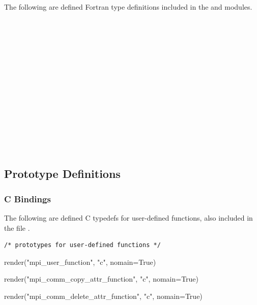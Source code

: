 The following are defined Fortran type definitions included in the  and  modules.
\\[6pt]
 \\
 \\
\code{ } \\
 \\
 \\
 \\
 \\
 \\
 \\
 \\
 \\
 \\
 \\
 \\


\subsection{Prototype Definitions} 
\label{subsec:annexa-prototypes} %

% 
\subsubsection{C Bindings} 
% 

The following are defined C typedefs for user-defined functions, 
also included in the file .

\begin{verbatim}
/* prototypes for user-defined functions */
\end{verbatim}
\begin{mpi-binding}
    render("mpi_user_function", "c", nomain=True)
\end{mpi-binding}

\begin{mpi-binding}
    render("mpi_comm_copy_attr_function", "c", nomain=True)
\end{mpi-binding}
\begin{mpi-binding}
    render("mpi_comm_delete_attr_function", "c", nomain=True)
\end{mpi-binding}

